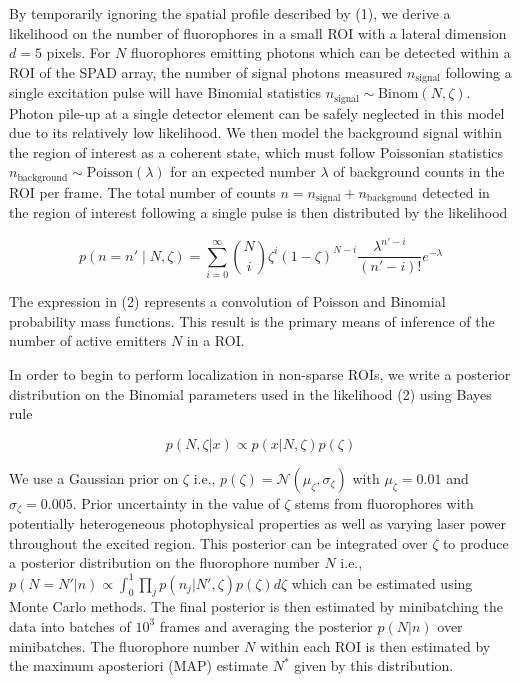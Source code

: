 \documentclass[a4paper, twocolumn, superscriptaddress,prl]{revtex4}  %
\begin{document}
By temporarily ignoring the spatial profile described by (1), we derive a likelihood on the number of fluorophores in a small ROI with a lateral dimension $d = 5$ pixels. For $N$ fluorophores emitting photons which can be detected within a ROI of the SPAD array, the number of signal photons measured $n_{\mathrm{signal}}$ following a single excitation pulse will have Binomial statistics $n_{\mathrm{signal}} \sim \mathrm{Binom}(N,\zeta)$. Photon pile-up at a single detector element can be safely neglected in this model due to its relatively low likelihood. We then model the background signal within the region of interest as a coherent state, which must follow Poissonian statistics $n_{\mathrm{background}} \sim \mathrm{Poisson}(\lambda)$ for an expected number $\lambda$ of background counts in the ROI per frame. The total number of counts $n=n_{\mathrm{signal}}+n_{\mathrm{background}}$ detected in the region of interest following a single pulse is then distributed by the likelihood

\begin{equation}
p(n=n' \mid N, \zeta) = \sum_{i=0}^{\infty} \binom{N}{i} \zeta^i (1-\zeta)^{N-i} \frac{\lambda^{n'-i}}{(n'-i)!} e^{-\lambda}
\end{equation}

The expression in (2) represents a convolution of Poisson and Binomial probability mass functions. This result is the primary means of inference of the number of active emitters $N$ in a ROI.

In order to begin to perform localization in non-sparse ROIs, we write a posterior distribution on the Binomial parameters used in the likelihood (2) using Bayes rule

\begin{equation}
p(N,\zeta|x) \propto p(x|N,\zeta)p(\zeta)
\end{equation}

We use a Gaussian prior on $\zeta$ i.e., $p(\zeta) = \mathcal{N}(\mu_{\zeta},\sigma_{\zeta})$ with $\mu_{\zeta}=0.01$ and $\sigma_{\zeta}=0.005$. Prior uncertainty in the value of $\zeta$ stems from fluorophores with potentially heterogeneous photophysical properties as well as varying laser power throughout the excited region. This posterior can be integrated over $\zeta$ to produce a posterior distribution on the fluorophore number $N$ i.e., $p(N=N'|n) \propto \int_{0}^{1} \prod_{j} p(n_{j}|N',\zeta)p(\zeta) d\zeta$ which can be estimated using Monte Carlo methods. The final posterior is then estimated by minibatching the data into batches of $10^3$ frames and averaging the posterior $p(N|n)$ over minibatches. The fluorophore number $N$ within each ROI is then estimated by the maximum aposteriori (MAP) estimate $N^{*}$ given by this distribution.
\end{document}
